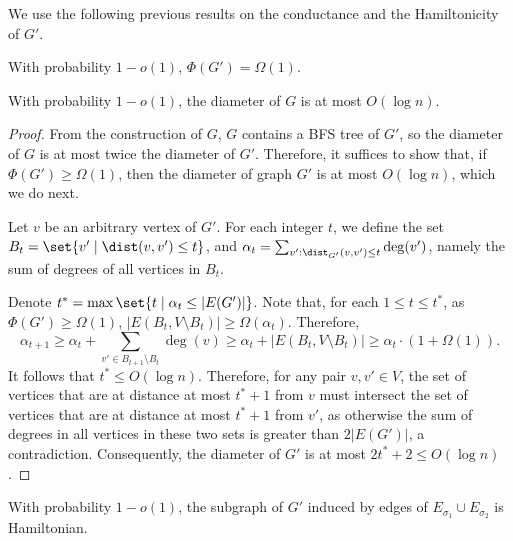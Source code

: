
We use the following previous results on the conductance and the Hamiltonicity of $G'$.

\begin{lemma}  \label{lem:expansion}
    With probability $1-o(1)$, $\Phi(G') = \Omega(1)$.
\end{lemma}

\begin{corollary}
\label{cor: diam}
With probability $1-o(1)$, the diameter of $G$ is at most $O(\log n)$.
\end{corollary}
\begin{proof}
From the construction of $G$, $G$ contains a BFS tree of $G'$, so the diameter of $G$ is at most twice the diameter of $G'$. Therefore, it suffices to show that, if $\Phi(G') \ge \Omega(1)$, then the diameter of graph $G'$ is at most $O(\log n)$, which we do next.

Let $v$ be an arbitrary vertex of $G'$. For each integer $t$, we define the set $B_t=\set{v'\mid \dist(v,v')\le t}$, and $\alpha_t=\sum_{v': \dist_{G'}(v,v')\le t}\deg(v')$, namely  the sum of degrees of all vertices in $B_t$. 

Denote $t^*=\max\set{t\mid \alpha_t\le |E(G')|}$.
Note that, for each $1\le t\le t^*$, as $\Phi(G') \ge \Omega(1)$,
$|E(B_t,V\setminus B_t)|\ge \Omega(\alpha_t)$. Therefore, \[\alpha_{t+1}\ge \alpha_t+\sum_{v'\in B_{t+1}\setminus B_{t}}\deg(v)\ge \alpha_t+ |E(B_t,V\setminus B_t)|\ge \alpha_t\cdot (1+\Omega(1)).\]
It follows that $t^*\le O(\log n)$. Therefore, for any pair $v,v'\in V$, the set of vertices that are at distance at most $t^*+1$ from $v$ must intersect the set of vertices that are at distance at most $t^*+1$ from $v'$, as otherwise the sum of degrees in all vertices in these two sets is greater than $2|E(G')|$, a contradiction. Consequently, the diameter of $G'$ is at most $2t^*+2\le O(\log n)$.
\end{proof}


\begin{lemma}  \label{lem:cycle}
With probability $1-o(1)$, the subgraph of $G'$ induced by edges of $E_{\sigma_1}\cup E_{\sigma_2}$ is Hamiltonian. 
\end{lemma}




